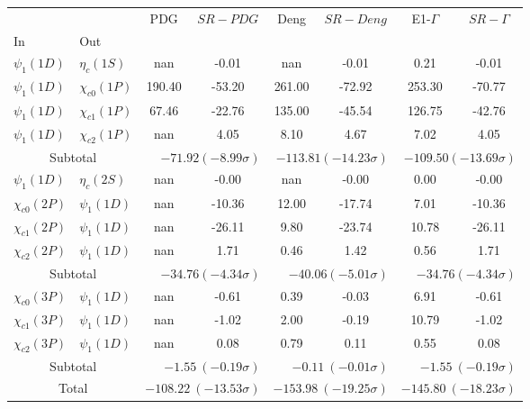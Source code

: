 \begin{tabular}{|l|l|c|c|c|c|c|c|}%
\hline%
&&PDG&$SR-PDG$&Deng&$SR-Deng$&E1-$\Gamma$&$SR-\Gamma$\\%
In&Out&&&&&&\\%
\hline%
$\psi_{1}(1D)$&$\eta_{c}(1S)$&nan&-0.01&nan&-0.01&0.21&-0.01\\%
$\psi_{1}(1D)$&$\chi_{c0}(1P)$&190.40&-53.20&261.00&-72.92&253.30&-70.77\\%
$\psi_{1}(1D)$&$\chi_{c1}(1P)$&67.46&-22.76&135.00&-45.54&126.75&-42.76\\%
$\psi_{1}(1D)$&$\chi_{c2}(1P)$&nan&4.05&8.10&4.67&7.02&4.05\\%
\hline%
\hline%
\multicolumn{2}{|c|}{Subtotal}&\multicolumn{2}{|r|}{$-71.92 (-8.99\sigma)$}&\multicolumn{2}{|r|}{$-113.81 (-14.23\sigma)$}&\multicolumn{2}{|r|}{$-109.50 (-13.69\sigma)$}\\%
\hline%
\hline%
$\psi_{1}(1D)$&$\eta_{c}(2S)$&nan&-0.00&nan&-0.00&0.00&-0.00\\%
$\chi_{c0}(2P)$&$\psi_{1}(1D)$&nan&-10.36&12.00&-17.74&7.01&-10.36\\%
$\chi_{c1}(2P)$&$\psi_{1}(1D)$&nan&-26.11&9.80&-23.74&10.78&-26.11\\%
$\chi_{c2}(2P)$&$\psi_{1}(1D)$&nan&1.71&0.46&1.42&0.56&1.71\\%
\hline%
\hline%
\multicolumn{2}{|c|}{Subtotal}&\multicolumn{2}{|r|}{$-34.76 (-4.34\sigma)$}&\multicolumn{2}{|r|}{$-40.06 (-5.01\sigma)$}&\multicolumn{2}{|r|}{$-34.76 (-4.34\sigma)$}\\%
\hline%
\hline%
$\chi_{c0}(3P)$&$\psi_{1}(1D)$&nan&-0.61&0.39&-0.03&6.91&-0.61\\%
$\chi_{c1}(3P)$&$\psi_{1}(1D)$&nan&-1.02&2.00&-0.19&10.79&-1.02\\%
$\chi_{c2}(3P)$&$\psi_{1}(1D)$&nan&0.08&0.79&0.11&0.55&0.08\\%
\hline%
\hline%
\multicolumn{2}{|c|}{Subtotal}&\multicolumn{2}{|r|}{$-1.55~(-0.19\sigma)$}&\multicolumn{2}{|r|}{$-0.11~(-0.01\sigma)$}&\multicolumn{2}{|r|}{$-1.55~(-0.19\sigma)$}\\%
\hline%
\hline%
\multicolumn{2}{|c|}{Total}&\multicolumn{2}{|r|}{$-108.22~(-13.53\sigma)$}&\multicolumn{2}{|r|}{$-153.98~(-19.25\sigma)$}&\multicolumn{2}{|r|}{$-145.80~(-18.23\sigma)$}\\%
\hline%
\end{tabular}